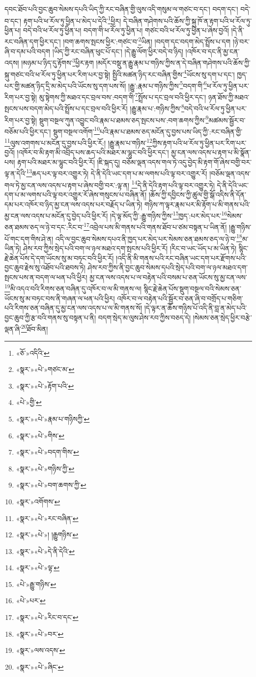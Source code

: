 དབང་ཐོབ་པའི་བྱང་ཆུབ་སེམས་དཔའི་ཡིད་ཀྱི་རང་བཞིན་གྱི་ལུས་འདི་གསུམ་ལ་གཙང་བ་དང་། བདག་དང་། བདེ་བ་དང་། རྟག་པའི་ཕ་རོལ་ཏུ་ཕྱིན་པ་མེད་པ་དེའི་\footnote{«ཅོ་»འདིའི་}ཕྱིར། དེ་བཞིན་གཤེགས་པའི་ཆོས་ཀྱི་སྐུ་ཁོ་ན་རྟག་པའི་ཕ་རོལ་ཏུ་ཕྱིན་པ། བདེ་བའི་ཕ་རོལ་ཏུ་ཕྱིན་པ། བདག་གི་ཕ་རོལ་ཏུ་ཕྱིན་པ། གཙང་བའི་ཕ་རོལ་ཏུ་ཕྱིན་པ་ཞེས་བྱའོ། །དེ་ནི་རང་བཞིན་དག་ཕྱིར་དང་། །བག་ཆགས་སྤངས་ཕྱིར་:གཙང་བ་\footnote{«སྣར་»«པེ་»གཙང་མ་}ཡིན། །བདག་དང་བདག་མེད་སྤྲོས་པ་དག །ཉེ་བར་ཞི་བ་དམ་པའི་བདག །ཡིད་ཀྱི་རང་བཞིན་ཕུང་པོ་དང་། །དེ་རྒྱུ་ལོག་ཕྱིར་བདེ་བ་ཉིད། །འཁོར་བ་དང་ནི་མྱ་ངན་འདས། །མཉམ་པ་ཉིད་དུ་རྟོགས་\footnote{«སྣར་»«པེ་»རྟོག་པའི་}ཕྱིར་རྟག །མདོར་བསྡུ་ན་རྒྱུ་རྣམ་པ་གཉིས་ཀྱིས་ན་དེ་བཞིན་གཤེགས་པའི་ཆོས་ཀྱི་སྐུ་གཙང་བའི་ཕ་རོལ་ཏུ་ཕྱིན་པར་རིག་པར་བྱ་སྟེ། སྤྱིའི་མཚན་ཉིད་རང་བཞིན་གྱིས་\footnote{«པེ་»གྱི་}ཡོངས་སུ་དག་པ་དང་། ཁྱད་པར་གྱི་མཚན་ཉིད་དྲི་མ་མེད་པའི་ཡོངས་སུ་དག་པས་སོ། །རྒྱུ་:རྣམ་པ་གཉིས་ཀྱིས་\footnote{«སྣར་»«པེ་»རྣམ་པ་གཉིསཀྱི་}བདག་གི་\footnote{«སྣར་»«པེ་»གིས་}ཕ་རོལ་ཏུ་ཕྱིན་པར་རིག་པར་བྱ་སྟེ། མུ་སྟེགས་ཀྱི་མཐའ་དང་བྲལ་བས་:བདག་གི་\footnote{«སྣར་»«པེ་»བདག་གིས་}སྤྲོས་པ་དང་བྲལ་བའི་ཕྱིར་དང་། ཉན་ཐོས་ཀྱི་མཐའ་སྤངས་པས་བདག་མེད་པའི་སྤྲོས་པ་དང་བྲལ་བའི་ཕྱིར་རོ། །རྒྱུ་རྣམ་པ་:གཉིས་ཀྱིས་\footnote{«སྣར་»«པེ་»གཉིས་ཀྱི་}བདེ་བའི་ཕ་རོལ་ཏུ་ཕྱིན་པར་རིག་པར་བྱ་སྟེ། སྡུག་བསྔལ་ཀུན་འབྱུང་བའི་རྣམ་པ་ཐམས་ཅད་སྤངས་པས་:བག་ཆགས་ཀྱིས་\footnote{«སྣར་»«པེ་»བག་ཆགས་ཀྱི་}མཚམས་སྦྱོར་བ་བཅོམ་པའི་ཕྱིར་དང་། སྡུག་བསྔལ་འགོག་\footnote{«སྣར་»འགོགས་}པའི་རྣམ་པ་ཐམས་ཅད་མངོན་དུ་བྱས་པས་ཡིད་ཀྱི་:རང་བཞིན་གྱི་\footnote{«སྣར་»«པེ་»རང་བཞིན་}ལུས་འགགས་པ་མངོན་དུ་བྱས་པའི་ཕྱིར་རོ:། །རྒྱུ་རྣམ་པ་གཉིས་\footnote{«སྣར་»«པེ་»། །རྒྱུགཉིས་}ཀྱིས་རྟག་པའི་ཕ་རོལ་ཏུ་ཕྱིན་པར་རིག་པར་བྱའོ། །འཁོར་བ་མི་རྟག་མི་འབྲིད་པས་ཆད་པའི་མཐར་མ་ལྷུང་བའི་ཕྱིར་དང་། མྱ་ངན་ལས་འདས་པ་རྟག་པ་མི་སྣོན་པས། རྟག་པའི་མཐར་མ་ལྷུང་བའི་ཕྱིར་རོ། །ཇི་སྐད་དུ། བཅོམ་ལྡན་འདས་གལ་ཏེ་འདུ་བྱེད་མི་རྟག་གོ་ཞེས་བགྱི་བར་ལྟ་ན་དེའི་\footnote{«སྣར་»«པེ་»དེ་ནི་དེའི་}ཆད་པར་ལྟ་བར་འགྱུར་ཏེ། དེ་ནི་དེའི་ཡང་དག་པ་མ་ལགས་པའི་ལྟ་བར་འགྱུར་རོ། །བཅོམ་ལྡན་འདས་གལ་ཏེ་མྱ་ངན་ལས་འདས་པ་རྟག་པ་ཞེས་བགྱི་བར་:ལྟ་ན། \footnote{«སྣར་»«པེ་»ལྟ་}དེ་ནི་དེའི་རྟག་པའི་ལྟ་བར་འགྱུར་ཏེ། དེ་ནི་དེའི་ཡང་དག་པ་མ་ལགས་པའི་ལྟ་བར་འགྱུར་རོ་ཞེས་གསུངས་པ་བཞིན་ནོ། །ཆོས་ཀྱི་དབྱིངས་ཀྱི་ཚུལ་གྱི་སྒོ་འདིས་ནི་དོན་དམ་པར་འཁོར་བ་ཉིད་མྱ་ངན་ལས་འདས་པར་བརྗོད་པ་ཡིན་ཏེ། གཉིས་ཀ་ལྟར་རྣམ་པར་མི་རྟོག་པ་མི་གནས་པའི་མྱ་ངན་ལས་འདས་པ་མངོན་དུ་བྱེད་པའི་ཕྱིར་རོ། །དེ་ལྟ་མོད་ཀྱི་:རྒྱུ་གཉིས་ཀྱིས་\footnote{«པེ་»རྒྱུ་གཉིས་}ཁྱད་:པར་མེད་པར་\footnote{«པེ་»པར་}སེམས་ཅན་ཐམས་ཅད་ལ་ཉེ་བ་དང་:རིང་བ་\footnote{«སྣར་»«པེ་»རིང་བ་དང་}འབྲེལ་པས་མི་གནས་པའི་གནས་ཐོབ་པ་ཙམ་བསྟན་པ་ཡིན་ནོ། །རྒྱུ་གཉིས་པོ་གང་དག་གིས་ཤེ་ན། འདི་ལ་བྱང་ཆུབ་སེམས་དཔའ་ནི་ཁྱད་པར་མེད་པར་སེམས་ཅན་ཐམས་ཅད་ལ་ཉེ་བ་\footnote{«སྣར་»«པེ་»བར་}མ་ཡིན་ཏེ། ཤེས་རབ་ཀྱིས་སྲེད་པའི་བག་ལ་ཉལ་མཐའ་དག་སྤངས་པའི་ཕྱིར་རོ། །རིང་བ་ཡང་ཡོད་པ་མ་ཡིན་ཏེ། སྙིང་རྗེ་ཆེན་པོས་དེ་དག་ཡོངས་སུ་མ་བཏང་བའི་ཕྱིར་རོ། །འདི་ནི་མི་གནས་པའི་རང་བཞིན་ཡང་དག་པར་རྫོགས་པའི་བྱང་ཆུབ་རྗེས་སུ་འཐོབ་པའི་ཐབས་ཏེ། ཤེས་རབ་ཀྱིས་ནི་བྱང་ཆུབ་སེམས་དཔའི་སྲེད་པའི་བག་ལ་ཉལ་མཐའ་དག་སྤངས་པས་ན་བདག་ལ་ཕན་པའི་ཕྱིར། མྱ་ངན་ལས་འདས་པ་ལ་བརྟེན་པའི་བསམ་པ་ཅན་ཡོངས་སུ་མྱ་ངན་ལས་\footnote{«སྣར་»ལས་འདས་}མི་འདའ་བའི་རིགས་ཅན་བཞིན་དུ་འཁོར་བ་ལ་མི་གནས་ལ། སྙིང་རྗེ་ཆེན་པོས་སྡུག་བསྔལ་བའི་སེམས་ཅན་ཡོངས་སུ་མ་བཏང་བས་ནི་གཞན་ལ་ཕན་པའི་ཕྱིར། འཁོར་བ་ལ་བརྟེན་པའི་སྦྱོར་བ་ཅན་ཞི་བ་བགྲོད་པ་གཅིག་པའི་རིགས་ཅན་བཞིན་དུ་མྱ་ངན་ལས་འདས་པ་ལ་མི་གནས་སོ། །དེ་ལྟར་ན་ཆོས་གཉིས་པོ་འདི་ནི་བླ་ན་མེད་པའི་བྱང་ཆུབ་ཀྱི་རྩ་བའི་གནས་སུ་བསྟན་པ་ནི། བདག་སྲེད་མ་ལུས་ཤེས་རབ་ཀྱིས་བཅད་དེ། །སེམས་ཅན་སྲེད་ཕྱིར་བརྩེ་ལྡན་ཞི་\footnote{«སྣར་»«པེ་»ཞིང་}ཐོབ་མིན། 